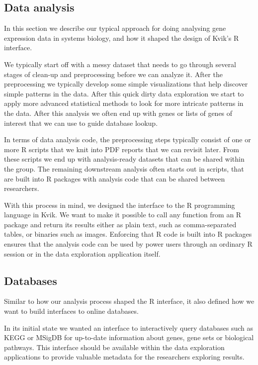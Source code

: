 \subsection*{Data analysis} 
In this section we describe our typical approach for doing analysing gene
expression data in systems biology, and how it shaped the design of Kvik's
R interface. 

We typically start off with a messy dataset that needs to go through
several stages of clean-up and preprocessing before we can analyze it. After the
preprocessing we typically develop some simple visualizations that help discover 
simple patterns in the data. After this quick dirty data exploration we start to
apply more advanced statistical methods to look for more intricate patterns in
the data. After this analysis we often end up with genes or lists of genes of
interest that we can use to guide database lookup. 

In terms of data analysis code, the preprocessing steps typically consist of
one or more R scripts that we knit \cite{knitr} into PDF reports that we can
revisit later. From these scripts we end up with analysis-ready datasets that
can be shared within the group. The remaining downstream analysis often starts
out in scripts, that are built into R packages with analysis code that can be
shared between researchers. 

With this process in mind, we designed the interface to the R programming
language in Kvik. We want to make it possible to call any function from an R
package and return its results either as plain text, such as comma-separated
tables, or binaries such as images. Enforcing that R code is built into R
packages ensures that the analysis code can be used by power users through an
ordinary R session or in the data exploration application itself. 


\subsection*{Databases} 
Similar to how our analysis process shaped the R interface, it also defined how
we want to build interfaces to online databases. 

In its initial state we wanted an interface to interactively query databases
such as KEGG or MSigDB for up-to-date information about genes, gene sets or
biological pathways. This interface should be available within the data
exploration applications to provide valuable metadata for the researchers
exploring results.  

